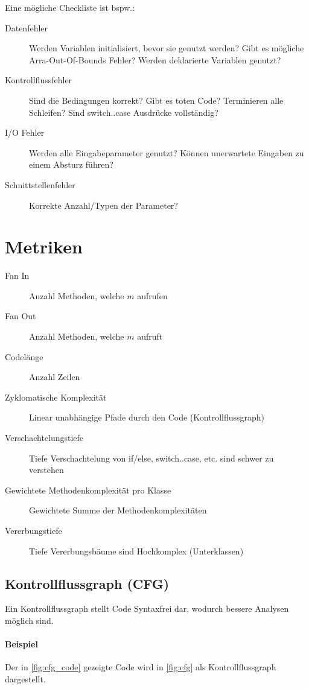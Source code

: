 \documentclass[a4paper, 11pt, accentcolor = tud3b]{tudreport}
\begin{document}
				Eine mögliche Checkliste ist bspw.:
				\begin{description}
					\item[Datenfehler] Werden Variablen initialisiert, bevor sie genutzt werden? Gibt es mögliche Arra-Out-Of-Bounds Fehler? Werden deklarierte Variablen genutzt?
					\item[Kontrollflussfehler] Sind die Bedingungen korrekt? Gibt es toten Code? Terminieren alle Schleifen? Sind switch..case Ausdrücke vollständig?
					\item[I/O Fehler] Werden alle Eingabeparameter genutzt? Können unerwartete Eingaben zu einem Absturz führen?
					\item[Schnittstellenfehler] Korrekte Anzahl/Typen der Parameter?
				\end{description}
		
		\section{Metriken}
			\label{sec:metrics}
			
			\begin{description}
				\item[Fan In] Anzahl Methoden, welche $ m $ aufrufen
				\item[Fan Out] Anzahl Methoden, welche $ m $ aufruft
				\item[Codelänge] Anzahl Zeilen
				\item[Zyklomatische Komplexität] Linear unabhängige Pfade durch den Code (Kontrollflussgraph)
				\item[Verschachtelungstiefe] Tiefe Verschachtelung von if/else, switch..case, etc. sind schwer zu verstehen
				\item[Gewichtete Methodenkomplexität pro Klasse] Gewichtete Summe der Methodenkomplexitäten
				\item[Vererbungstiefe] Tiefe Vererbungsbäume sind Hochkomplex (Unterklassen)
			\end{description}
		
			\subsection{Kontrollflussgraph (CFG)}
				\label{diagram:cfg}

				Ein Kontrollflussgraph stellt Code Syntaxfrei dar, wodurch bessere Analysen möglich sind.
				
				\paragraph{Beispiel}
					Der in \ref{fig:cfg_code} gezeigte Code wird in \ref{fig:cfg} als Kontrollflussgraph dargestellt.
\end{document}

